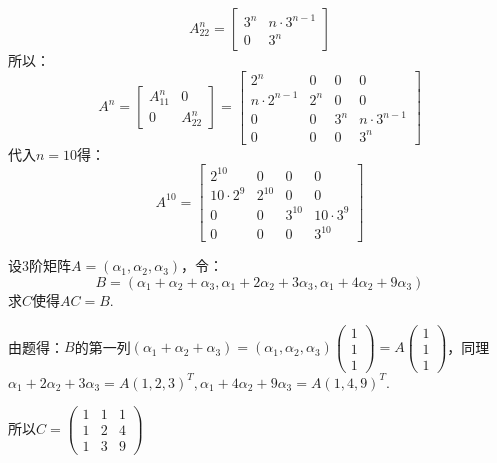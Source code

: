 \documentclass[a4paper]{report}
\begin{document}
\begin{jie}
\begin{equation*}
A_{22}^{n}=
\begin{bmatrix}
3^n&n\cdot3^{n-1}\\
0&3^n
\end{bmatrix}
\end{equation*}
所以：
\begin{equation*}
A^n=
\begin{bmatrix}
A_{11}^n&0\\
0&A_{22}^n
\end{bmatrix}=
\begin{bmatrix}
2^n&0&0&0\\
n\cdot2^{n-1}&2^n&0&0\\
0&0&3^n&n\cdot3^{n-1}\\
0&0&0&3^n
\end{bmatrix}
\end{equation*}
代入$n=10$得：\begin{equation*}
A^10=
\begin{bmatrix}
2^{10}&0&0&0\\
10\cdot2^{9}&2^{10}&0&0\\
0&0&3^{10}&10\cdot3^{9}\\
0&0&0&3^{10}
\end{bmatrix}\end{equation*}
\end{jie}

\EX 设3阶矩阵$A=(\alpha_1,\alpha_2,\alpha_3)$，令：
\begin{equation*}
B=(\alpha_1+\alpha_2+\alpha_3,\alpha_1+2\alpha_2+3\alpha_3,\alpha_1+4\alpha_2+9\alpha_3)
\end{equation*}
求$C$使得$AC=B$.

\begin{jie}
由题得：$B$的第一列$(\alpha_1+\alpha_2+\alpha_3)=(\alpha_1,\alpha_2,\alpha_3)
\begin{pmatrix}
1\\ 1\\ 1
\end{pmatrix}=A\begin{pmatrix}
1\\ 1\\ 1
\end{pmatrix}
$，同理$\alpha_1+2\alpha_2+3\alpha_3=A(1,2,3)^T,\alpha_1+4\alpha_2+9\alpha_3=A(1,4,9)^T$.

所以$C=
\begin{pmatrix}
1&1&1\\
1&2&4\\
1&3&9
\end{pmatrix}
$
\end{jie}
\end{document}
